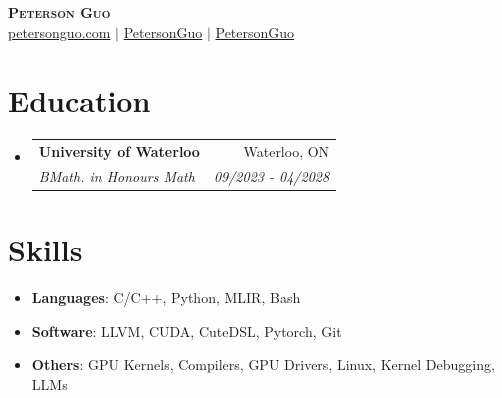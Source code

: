 \documentclass[letterpaper,11pt]{article}
\makeatletter
\providecommand{\ResumePhone}{}
\providecommand{\ResumeEmail}{}
\newcommand{\resumeSubheading}[4]{
    \vspace{-3pt}
    \item
    \begin{tabular*}{0.98\textwidth}{@{}l@{\extracolsep{\fill}}r@{}}
      \vspace{-3pt} \textbf{#1} & #2 \\
      \textit{\small #3} & \textit{\footnotesize #4} \\
    \end{tabular*}\vspace{-4pt}
}
\newcommand{\resumeSubHeadingListStart}{\begin{itemize}[leftmargin=0.13in, label={}]}
\newcommand{\resumeSubHeadingListEnd}{\end{itemize}}
\makeatother
\begin{document}
\begin{center}
    \textbf{\huge \scshape Peterson Guo } \\ \vspace{2pt}
  \ifx\ResumePhone\empty\else
  \href{tel:\ResumePhone}{\ResumePhone}
  \fi
  \href{mailto:\ResumeEmail}{{\ResumeEmail}}
    \href{https://petersonguo.com}{petersonguo.com} $|$
    \href{https://www.linkedin.com/in/PetersonGuo}{ PetersonGuo} $|$
    \href{https://github.com/PetersonGuo}{ PetersonGuo}
\end{center}

\vspace{-12pt}
\section{Education}
  \resumeSubHeadingListStart
    \resumeSubheading
      {University of Waterloo}{Waterloo, ON}
      {BMath. in Honours Math}{09/2023 - 04/2028}
  \resumeSubHeadingListEnd


\vspace{-5pt}
\section{Skills}
 \begin{itemize}[leftmargin=0.08in, label={}]
    \vspace{-3pt}\setlength\itemsep{-6pt}
    \item{\small{
        \textbf{Languages}{: C/C++, Python, MLIR, Bash}
     }}
    \item{\small{
        \textbf{Software}{: LLVM, CUDA, CuteDSL, Pytorch, Git}
    }}
    \item{\small{
        \textbf{Others}{: GPU Kernels, Compilers, GPU Drivers, Linux, Kernel Debugging, LLMs}
    }}
 \end{itemize}

\vspace{-10pt}
\end{document}

